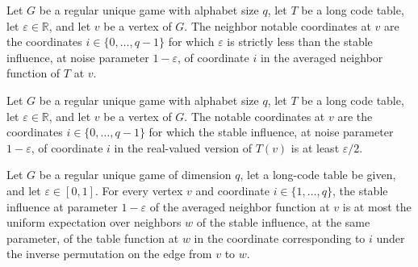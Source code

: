 \begin{definition}
\label{FABL.RegularUniqueGame.neighborNotableCoordinates}
\leanok
{}
Let $G$ be a regular unique game with alphabet size $q$, let $T$ be a long code table,
let $\varepsilon\in\mathbb R$, and let $v$ be a vertex of $G$. The neighbor notable
coordinates at $v$ are the coordinates $i\in\{0,\ldots,q-1\}$ for which
$\varepsilon$ is strictly less than the stable influence, at noise parameter
$1-\varepsilon$, of coordinate $i$ in the averaged neighbor function of $T$ at $v$.
\end{definition}

\begin{definition}
\label{FABL.RegularUniqueGame.notableCoordinates}
\leanok
{}
Let $G$ be a regular unique game with alphabet size $q$, let $T$ be a long code table,
let $\varepsilon\in\mathbb R$, and let $v$ be a vertex of $G$. The notable
coordinates at $v$ are the coordinates $i\in\{0,\ldots,q-1\}$ for which the stable
influence, at noise parameter $1-\varepsilon$, of coordinate $i$ in the real-valued
version of $T(v)$ is at least $\varepsilon/2$.
\end{definition}

\begin{theorem}
\label{FABL.RegularUniqueGame.stableInfluence_averagedNeighborFunction_le}
\leanok
{}
Let $G$ be a regular unique game of dimension $q$, let a long-code table be given, and
let $\varepsilon\in[0,1]$. For every vertex $v$ and coordinate $i\in\{1,\ldots,q\}$, the
stable influence at parameter $1-\varepsilon$ of the averaged neighbor function at $v$
is at most the uniform expectation over neighbors $w$ of the stable influence, at the
same parameter, of the table function at $w$ in the coordinate corresponding to $i$
under the inverse permutation on the edge from $v$ to $w$.
\end{theorem}

